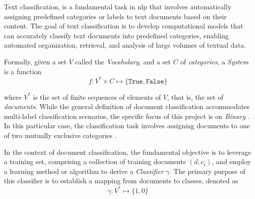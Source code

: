 \label{02_text_classification}

Text classification, is a fundamental task in \gls{nlp} that involves automatically assigning predefined categories or labels to text documents based on their content. The goal of text classification is to develop computational models that can accurately classify text documents into predefined categories, enabling automated organization, retrieval, and analysis of large volumes of textual data.

Formally, given a set $V$ called the \emph{Vocabulary}, and a set $C$ of \emph{categories}, a \emph{\textclassification{} System} is a function 
$$f: V^*\times C \mapsto \{ \texttt{True}, \texttt{False} \}$$

where $V^*$ is the set of finite sequences of elements of $V$, that is, the set of \emph{documents}. 
While the general definition of document classification accommodates multi-label classification scenarios, the specific focus of this project is on \emph{Binary \textclassification{}}. In this particular case, the classification task involves assigning documents to one of two mutually exclusive categories .

In the context of document classification, the fundamental objective is to leverage a training set, comprising a collection of training documents $(d, c_i)$, and employ a learning method or algorithm to derive a \emph{Classifier} $\gamma$. The primary purpose of this classifier is to establish a mapping from documents to classes, denoted as 
$$\gamma : V^* \mapsto \{1, 0\}$$
